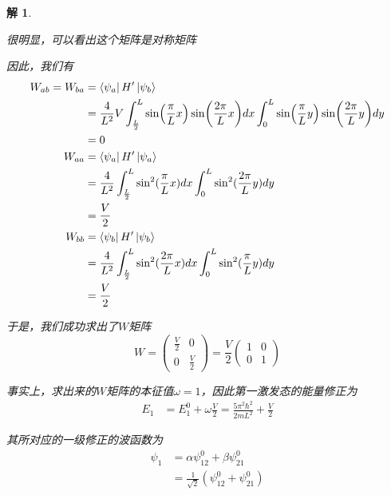 \documentclass{article}
\newtheorem{solution}{解}
\begin{document}
\begin{solution}
\begin{enumerate}
        很明显，可以看出这个矩阵是对称矩阵

        因此，我们有
        \begin{align*}
            W_{ab}=W_{ba}&=\bra{\psi_{a}}H^\prime\ket{\psi_{b}}\\
            &=\frac{4}{L^2}V\int_{\frac{L}{2}}^{L}\sin(\frac{\pi}{L}x)\sin(\frac{2\pi}{L}x)dx\int_{0}^{L}\sin(\frac{\pi}{L}y)\sin(\frac{2\pi}{L}y)dy\\
            &=0\\
            W_{aa}&=\bra{\psi_{a}}H^\prime\ket{\psi_{a}}\\
            &=\frac{4}{L^2}\int_{\frac{L}{2}}^{L}\sin^2(\frac{\pi}{L}x)dx\int_{0}^{L}\sin^2(\frac{2\pi}{L}y)dy\\
            &=\frac{V}{2}\\
            W_{bb}&=\bra{\psi_{b}}H^\prime\ket{\psi_{b}}\\
            &=\frac{4}{L^2}\int_{\frac{L}{2}}^{L}\sin^2(\frac{2\pi}{L}x)dx\int_{0}^{L}\sin^2(\frac{\pi}{L}y)dy\\
            &=\frac{V}{2}
        \end{align*}

        于是，我们成功求出了$W$矩阵
        \begin{equation*}
            W=
            \begin{pmatrix}
                \frac{V}{2} & 0\\
                0 & \frac{V}{2}
            \end{pmatrix}
            =\frac{V}{2}
            \begin{pmatrix}
                1 & 0\\
                0 & 1
            \end{pmatrix}
        \end{equation*}

        事实上，求出来的$W$矩阵的本征值$\omega=1$，因此第一激发态的能量修正为
        \begin{align*}
            E_1&=E_1^0+\omega\frac{V}{2}=\frac{5\pi^2\hbar^2}{2mL^2}+\frac{V}{2}
        \end{align*}

        其所对应的一级修正的波函数为
        \begin{align*}
            \psi_1&=\alpha\psi_{12}^0+\beta\psi_{21}^0\\
            &=\frac{1}{\sqrt{2}}\left(\psi_{12}^0+\psi_{21}^0\right)
        \end{align*}
    \end{enumerate}
\end{solution}
\end{document}
